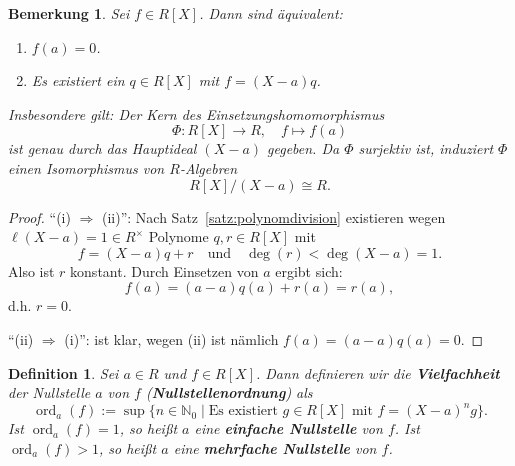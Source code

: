 \documentclass[a4paper, twoside, 11pt, ngerman]{report}
\newcommand{\NN}{\mathds N}
\DeclareMathOperator{\ord}{ord}
\theoremstyle{definistyle}
\newtheorem{defini}[satz]{Definition}
\newtheorem{bem}[satz]{Bemerkung}
\theoremstyle{remark}
\newcommand{\defn}[1]{\textit{\bfseries #1}}
\begin{document}
\begin{bem}\label{bem:nullstellen-polynome}
Sei $f \in R[X]$. Dann sind äquivalent:
\begin{enumerate}[label=(\roman*)]
    \item $f(a) = 0$.
    \item Es existiert ein $q \in R[X]$ mit $f = (X - a)q$.
\end{enumerate}
Insbesondere gilt: Der Kern des Einsetzungshomomorphismus
\[
\Phi \colon R[X] \to R, \quad f \mapsto f(a)
\]
ist genau durch das Hauptideal $(X - a)$ gegeben. Da $\Phi$ surjektiv ist, induziert $\Phi$ einen Isomorphismus von $R$-Algebren
\[
R[X] / (X - a) \cong R.
\]
\end{bem}
\begin{proof}
"`(i) $\Rightarrow$ (ii)"': Nach Satz~\ref{satz:polynomdivision} existieren wegen $\ell(X - a) = 1 \in R^\times$ Polynome $q, r \in R[X]$ mit
\[
f = (X - a)q + r \quad \text{und} \quad \deg(r) < \deg(X - a) = 1.
\]
Also ist $r$ konstant. Durch Einsetzen von $a$ ergibt sich:
\[
f(a) = (a - a)q(a) + r(a) = r(a),
\]
d.h. $r = 0$.

"`(ii) $\Rightarrow$ (i)"': ist klar, wegen (ii) ist nämlich $f(a) = (a - a)q(a)=0$.
\end{proof}

\begin{defini}\label{def:nullstellenordnung}
Sei $a \in R$ und $f\in R[X]$. Dann definieren wir die \defn{Vielfachheit} der Nullstelle $a$ von $f$ (\defn{Nullstellenordnung}) als
\[
\ord_a(f) := \sup \{n \in \NN_0 \mid \text{Es existiert } g \in R[X] \text{ mit } f = (X - a)^n g \}.
\]
Ist $\operatorname{ord}_a(f) = 1$, so heißt $a$ eine \defn{einfache Nullstelle} von $f$.
Ist $\operatorname{ord}_a(f) > 1$, so heißt $a$ eine \defn{mehrfache Nullstelle} von $f$.
\end{defini}
\end{document}
